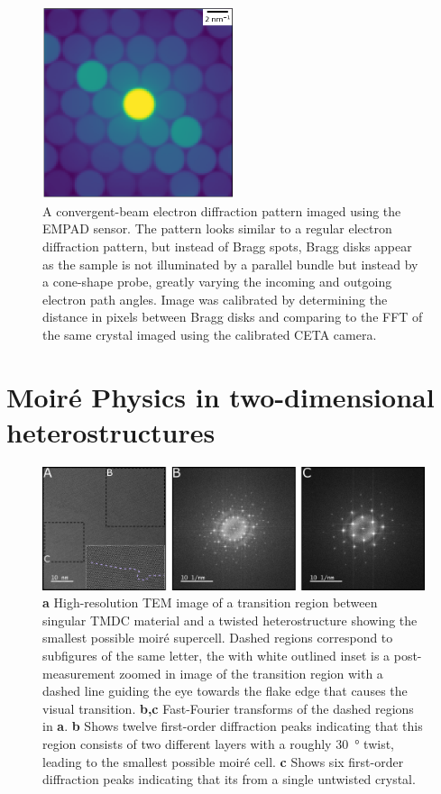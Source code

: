 \begin{figure}
    \centering
    \includegraphics[width=0.5\textwidth, keepaspectratio]{resources/Figures/pacbed_hole.png}
    \caption{A convergent-beam electron diffraction pattern imaged using the EMPAD sensor. The pattern looks similar to a regular electron diffraction pattern, but instead of Bragg spots, Bragg disks appear as the sample is not illuminated by a parallel bundle but instead by a cone-shape probe, greatly varying the incoming and outgoing electron path angles. Image was calibrated by determining the distance in pixels between Bragg disks and comparing to the FFT of the same crystal imaged using the calibrated CETA camera.}
    \label{fig:pacbed}
\end{figure}

\section{Moiré Physics in two-dimensional heterostructures}

\begin{figure}[h]
    \centering
    \includegraphics[width=1\linewidth, keepaspectratio]{resources/Figures/moire_transition.png}
    \caption{\textbf{a} High-resolution TEM image of a transition region between singular TMDC material and a twisted heterostructure showing the smallest possible moiré supercell. Dashed regions correspond to subfigures of the same letter, the with white outlined inset is a post-measurement zoomed in image of the transition region with a dashed line guiding the eye towards the flake edge that causes the visual transition. \textbf{b,c} Fast-Fourier transforms of the dashed regions in \textbf{a}. \textbf{b} Shows twelve first-order diffraction peaks indicating that this region consists of two different layers with a roughly \SI{30}{\degree} twist, leading to the smallest possible moiré cell. \textbf{c} Shows six first-order diffraction peaks indicating that its from a single untwisted  crystal. }
    \label{fig:moire_trans}
\end{figure}

